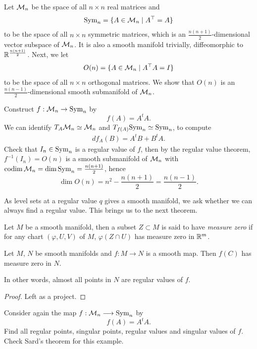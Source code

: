 \begin{homework}
  Let \(\cal{M}_n\) be the space of all \(n\times n\) real matrices and \[
    \Sym_n = \{A\in\cal{M}_n\mid A^\top = A\}
  \] to be the space of all \(n\times n\) symmetric matrices, which is an \(\frac{n(n+1)}{2}\)-dimensional vector subspace of \(\cal{M}_n\). It is also a smooth manifold trivially, diffeomorphic to \(\R^{\frac{n(n+1)}{2}}\).
  Next, we let \[
    O(n) = \{A\in\cal{M}_n\mid A^\top A = I\}
  \] to be the space of all \(n\times n\) orthogonal matrices. We show that \(O(n)\) is an \(\frac{n(n-1)}{2}\)-dimensional smooth submanifold of \(\cal{M}_n\).
  \begin{roof}
    Construct \(f:\cal{M}_n \to \Sym_n\) by \[
      f(A) = A^t A.
    \]
    We can identify \(T_A\cal{M}_n\simeq\cal{M}_n\) and \(T_{f(A)}\Sym_n\simeq\Sym_n\), to compute \begin{align*}
      df_A(B) = A^t B + B^t A.
    \end{align*}
    Check that \(I_n\in\Sym_n\) is a regular value of \(f\), then by the regular value theorem, \(f^{-1}(I_n) = O(n)\) is a smooth submanifold of \(\cal{M}_n\) with \(\codim\cal{M}_n = \dim\Sym_n = \frac{n(n+1)}{2}\), hence \[
      \dim O(n) = n^2 - \frac{n(n+1)}{2} = \frac{n(n-1)}{2}.
    \]
  \end{roof}
\end{homework}

As level sets at a regular value \(q\) gives a smooth manifold, we ask whether we can always find a regular value. This brings us to the next theorem.
\begin{definition}
  Let \(M\) be a smooth manifold, then a subset \(Z\subset M\) is said to have \emph{measure zero} if for any chart \((\varphi,U,V)\) of \(M\), \(\varphi(Z\cap U)\) has measure zero in \(\R^m\).
\end{definition}

\begin{theorem}
  Let \(M\), \(N\) be smooth manifolds and \(f:M\to N\) is a smooth map. Then \(f(C)\) has measure zero in \(N\).

  In other words, almost all points in \(N\) are regular values of \(f\).
\end{theorem}
\begin{proof}
  Left as a project.
\end{proof}

\begin{homework}
  Consider again the map \(f:\cal{M}_n\longrightarrow \Sym_n\) by \[
    f(A) = A^t A.
  \]
  Find all regular points, singular points, regular values and singular values of \(f\). Check Sard's theorem for this example.
\end{homework}

